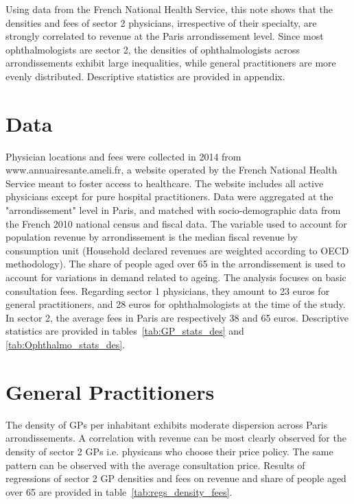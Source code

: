 \documentclass[11pt]{article}
\begin{document}
Using data from the French National Health Service, this note shows that the densities and fees of sector 2 physicians, irrespective of their specialty, are strongly correlated to revenue at the Paris arrondissement level. Since most ophthalmologists are sector 2, the densities of ophthalmologists across arrondissements exhibit large inequalities, while general practitioners are more evenly distributed. Descriptive statistics are provided in appendix.

\section{Data}

Physician locations and fees were collected in 2014 from www.annuairesante.ameli.fr, a website operated by the French National Health Service meant to foster access to healthcare. The website includes all active physicians except for pure hospital practitioners. Data were aggregated at the "arrondissement" level in Paris, and matched with socio-demographic data from the French 2010 national census and fiscal data. The variable used to account for population revenue by arrondissement is the median fiscal revenue by consumption unit (Household declared revenues are weighted according to OECD methodology). The share of people aged over 65 in the arrondissement is used to account for variations in demand related to ageing. The analysis focuses on basic consultation fees. Regarding sector 1 physicians, they amount to 23 euros for general practitioners, and 28 euros for ophthalmologists at the time of the study. In sector 2, the average fees in Paris are respectively 38 and 65 euros. Descriptive statistics are provided in tables~\ref{tab:GP_stats_des} and \ref{tab:Ophthalmo_stats_des}.

\section{General Practitioners}

The density of GPs per inhabitant exhibits moderate dispersion across Paris arrondissements. A correlation with revenue can be most clearly observed for the density of sector 2 GPs i.e. physicans who choose their price policy. The same pattern can be observed with the average consultation price. Results of regressions of sector 2 GP densities and fees on revenue and share of people aged over 65 are provided in table~\ref{tab:regs_density_fees}.
\end{document}
